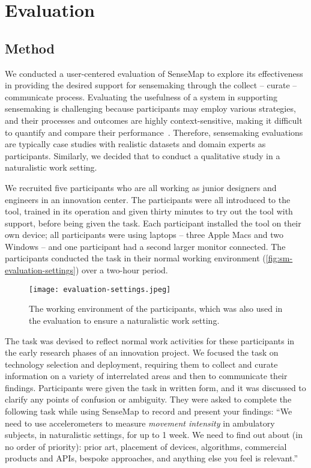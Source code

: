 \section{Evaluation}

\subsection{Method}
We conducted a user-centered evaluation of SenseMap to explore its effectiveness in providing the desired support for sensemaking through the collect -- curate -- communicate process. Evaluating the usefulness of a system in supporting sensemaking is challenging because  participants may employ various strategies, and their processes and outcomes are highly context-sensitive, making it difficult to quantify and compare their performance~\cite{Lam2012}. Therefore, sensemaking evaluations are typically case studies with realistic datasets and domain experts as participants. Similarly, we decided that to conduct a qualitative study in a naturalistic work setting.

We recruited five participants who are all working as junior designers and engineers in an innovation center. The participants were all introduced to the tool, trained in its operation and given thirty minutes to try out the tool with support, before being given the task. Each participant installed the tool on their own device; all participants were using laptops -- three Apple Macs and two Windows -- and one participant had a second larger monitor connected. The participants conducted the task in their normal working environment (\autoref{fig:sm-evaluation-settings}) over a two-hour period.

\begin{figure}[!htb]
	\centering
	\texttt{[image: evaluation-settings.jpeg]}
	\caption{The working environment of the participants, which was also used in the evaluation to ensure a naturalistic work setting.}
	\label{fig:sm-evaluation-settings}
\end{figure}

The task was devised to reflect normal work activities for these participants in the early research phases of an innovation project. We focused the task on technology selection and deployment, requiring them to collect and curate information on a variety of interrelated areas and then to communicate their findings. Participants were given the task in written form, and it was discussed to clarify any points of confusion or ambiguity. They were asked to complete the following task while using SenseMap to record and present your findings: ``We need to use accelerometers to measure \textit{movement intensity} in ambulatory subjects, in naturalistic settings, for up to 1 week. We need to find out about (in no order of priority): prior art, placement of devices, algorithms, commercial products and APIs, bespoke approaches, and anything else you feel is relevant.''

